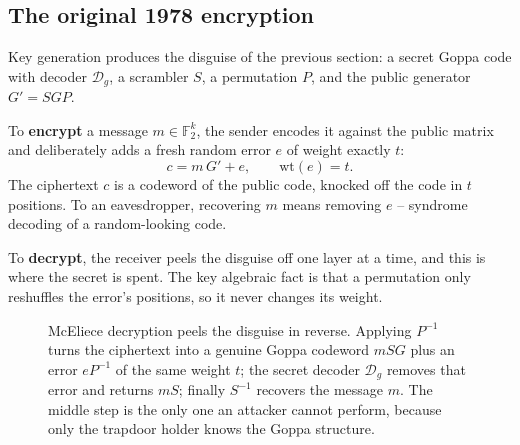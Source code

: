 \subsection{The original 1978 encryption}

Key generation produces the disguise of the previous section: a secret Goppa code with decoder $\mathcal{D}_g$, a scrambler $S$, a permutation $P$, and the public generator $G' = SGP$.

To \textbf{encrypt} a message $m \in \mathbb{F}_2^k$, the sender encodes it against the public matrix and deliberately adds a fresh random error $e$ of weight exactly $t$:
\[
c = m\,G' + e , \qquad \mathrm{wt}(e) = t .
\]
The ciphertext $c$ is a codeword of the public code, knocked off the code in $t$ positions. To an eavesdropper, recovering $m$ means removing $e$ -- syndrome decoding of a random-looking code.

To \textbf{decrypt}, the receiver peels the disguise off one layer at a time, and this is where the secret is spent. The key algebraic fact is that a permutation only reshuffles the error's positions, so it never changes its weight.

\begin{figure}[H]
\centering
{}
\caption{McEliece decryption peels the disguise in reverse. Applying $P^{-1}$ turns the ciphertext into a genuine Goppa codeword $mSG$ plus an error $eP^{-1}$ of the same weight $t$; the secret decoder $\mathcal{D}_g$ removes that error and returns $mS$; finally $S^{-1}$ recovers the message $m$. The middle step is the only one an attacker cannot perform, because only the trapdoor holder knows the Goppa structure.}
\label{fig:mceliece-decrypt}
\end{figure}

